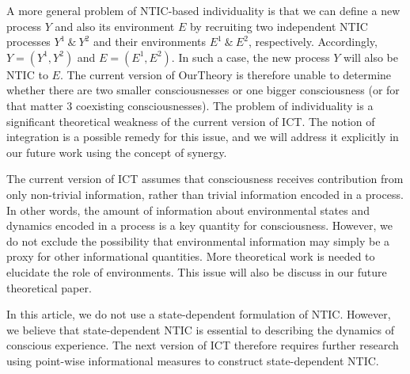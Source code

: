 \documentclass[utf8]{article}
\begin{document}
        A more general problem of NTIC-based individuality is that
        we can define a new process $Y$ and also its environment $E$ by recruiting two independent NTIC processes $Y^1~\&~Y^2$ and their environments $E^1~\&~E^2$, respectively. Accordingly, $Y = (Y^1,Y^2)$ and $E=(E^1,E^2)$. In such a case, the new process $Y$ will also be NTIC to $E$. The current version of \ac{OurTheory} is therefore unable to determine whether there are two smaller consciousnesses or one bigger consciousness (or for that matter 3 coexisting consciousnesses). The problem of individuality is a significant theoretical weakness of the current version of ICT. The notion of integration is a possible remedy for this issue, and we will address it explicitly in our future work using the concept of synergy.
        
        The current version of ICT assumes that consciousness receives contribution from only non-trivial information, rather than trivial information encoded in a process. In other words, the amount of information about environmental states and dynamics encoded in a process is a key quantity for consciousness. However, we do not exclude the possibility that environmental information may simply be a proxy for other informational quantities. More theoretical work is needed to elucidate the role of environments. This issue will also be discuss in our future theoretical paper.
        
        In this article, we do not use a state-dependent formulation of NTIC. However, we believe that state-dependent NTIC is essential to describing the dynamics of conscious experience. The next version of ICT therefore requires further research using point-wise informational measures to construct state-dependent NTIC.
        
\end{document}
